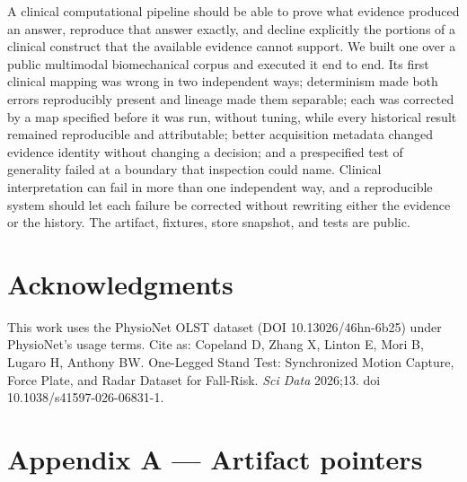 \documentclass[11pt]{article}
\begin{document}
A clinical computational pipeline should be able to prove what evidence produced an answer, reproduce that answer exactly, and decline explicitly the portions of a clinical construct that the available evidence cannot support. We built one over a public multimodal biomechanical corpus and executed it end to end. Its first clinical mapping was wrong in two independent ways; determinism made both errors reproducibly present and lineage made them separable; each was corrected by a map specified before it was run, without tuning, while every historical result remained reproducible and attributable; better acquisition metadata changed evidence identity without changing a decision; and a prespecified test of generality failed at a boundary that inspection could name. Clinical interpretation can fail in more than one independent way, and a reproducible system should let each failure be corrected without rewriting either the evidence or the history. The artifact, fixtures, store snapshot, and tests are public.

\section{Acknowledgments}\label{acknowledgments}

This work uses the PhysioNet OLST dataset (DOI 10.13026/46hn-6b25) under PhysioNet's usage terms. Cite as: Copeland D, Zhang X, Linton E, Mori B, Lugaro H, Anthony BW. One-Legged Stand Test: Synchronized Motion Capture, Force Plate, and Radar Dataset for Fall-Risk. \emph{Sci Data} 2026;13. doi 10.1038/s41597-026-06831-1.

\section{Appendix A --- Artifact pointers}\label{appendix-a-artifact-pointers}
\end{document}
